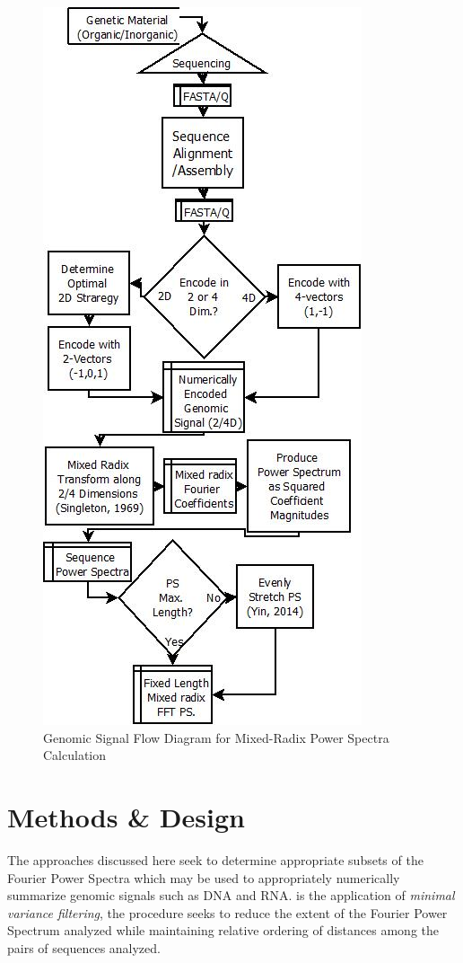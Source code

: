 \documentclass[12pt,journal,compsoc]{IEEEtran}
\begin{document}
\begin{figure}[h!]
\caption{Genomic Signal Flow Diagram for Mixed-Radix Power Spectra Calculation} 
\label{fig:fftflow} 
\begin{center} 
\includegraphics[scale=0.5]{Images/Files/GenomicFFTSignalFlow.png}
\end{center} 
\end{figure} 


\section{Methods \& Design}
\label{sec:meth}

The approaches discussed here seek to determine appropriate subsets of the Fourier Power Spectra 
which may be used to appropriately numerically summarize genomic signals such as DNA and RNA. 
is the application of \textit{minimal variance filtering}, the 
procedure seeks to reduce the extent of the Fourier Power Spectrum analyzed while maintaining 
relative ordering of distances among the pairs of sequences analyzed.  
\end{document}
